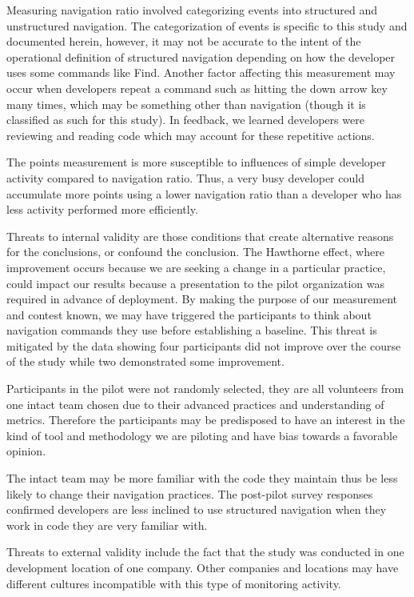 \documentclass{sig-alternate}
\begin{document}
Measuring navigation ratio involved categorizing events into structured and unstructured navigation.  The categorization of events is specific to this study and documented herein, however, it may not be accurate to the intent of the operational definition of structured navigation depending on how the developer uses some commands like Find.  Another factor affecting this measurement may occur when developers repeat a command such as hitting the down arrow key many times, which may be something other than navigation (though it is classified as such for this study).  In feedback, we learned developers were reviewing and reading code which may account for these repetitive actions.

The points measurement is more susceptible to influences of simple developer activity compared to navigation ratio.  Thus, a very busy developer could accumulate more points using a lower navigation ratio than a developer who has less activity performed more efficiently.  

Threats to internal validity are those conditions that create alternative reasons for the conclusions, or confound the conclusion.  
The Hawthorne effect, where improvement occurs because we are seeking a change in a particular practice, could impact our results because a presentation  to the pilot organization was required in advance of deployment.  By making the purpose of our measurement and contest known,  we may have triggered the participants to think about navigation commands they use before establishing a baseline.   This threat is mitigated by the data showing four participants did not improve over the course of the study while two demonstrated some improvement.

Participants in the pilot were not randomly selected, they are all volunteers from one intact team chosen due to their advanced practices and understanding of metrics.  Therefore the participants may be predisposed to have an interest in the kind of tool and methodology we are piloting and have bias towards a favorable opinion.  

The intact team may be more familiar with the code they maintain thus be less likely to change their navigation practices.  The post-pilot survey responses confirmed developers are less inclined to use structured navigation when they work in code they are very familiar with.  

Threats to external validity include the fact that the study was conducted in one development location of one company.  Other companies and locations may have different cultures incompatible with this type of monitoring activity.
\end{document}
